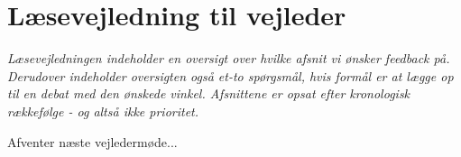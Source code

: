 
\chapter*{Læsevejledning til vejleder}

\textit{Læsevejledningen indeholder en oversigt over hvilke afsnit vi ønsker feedback på. Derudover indeholder oversigten også et-to spørgsmål, hvis formål er at lægge op til en debat med den ønskede vinkel. Afsnittene er opsat efter kronologisk rækkefølge - og altså ikke prioritet.}\bigskip

\noindent Afventer næste vejledermøde...